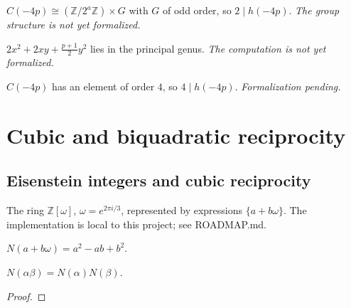 \begin{theorem}[Exercise 3.25(a)]
  \label{exr:s3_25_a}
  \notready
  $C(-4p)\cong(\mathbb Z/2^a\mathbb Z)\times G$ with $G$ of odd order, so $2\mid h(-4p)$.
  \emph{The group structure is not yet formalized.}
\end{theorem}

\begin{theorem}[Exercise 3.25(b)]
  \label{exr:s3_25_b}
  \notready
  $2x^2+2xy+\tfrac{p+1}{2}y^2$ lies in the principal genus.
  \emph{The computation is not yet formalized.}
\end{theorem}

\begin{theorem}[Exercise 3.25(c)]
  \label{exr:s3_25_c}
  \notready
  $C(-4p)$ has an element of order $4$, so $4\mid h(-4p)$. \emph{Formalization pending.}
\end{theorem}

\section{Cubic and biquadratic reciprocity}

\subsection{Eisenstein integers and cubic reciprocity}

\begin{definition}
  \label{def:eisenstein_int}
  \leanok
  The ring $\mathbb Z[\omega]$, $\omega = e^{2\pi i/3}$, represented by expressions
  $\{a + b\omega\}$. The implementation is local to this project; see ROADMAP.md.
\end{definition}

\begin{definition}
  \label{def:eisenstein_norm}
  \leanok
  $N(a + b\omega) = a^2 - ab + b^2$.
\end{definition}

\begin{lemma}
  \label{lem:eisenstein_norm_mul}
  \leanok
  $N(\alpha\beta) = N(\alpha)N(\beta)$.
\end{lemma}
\begin{proof}\leanok\end{proof}

